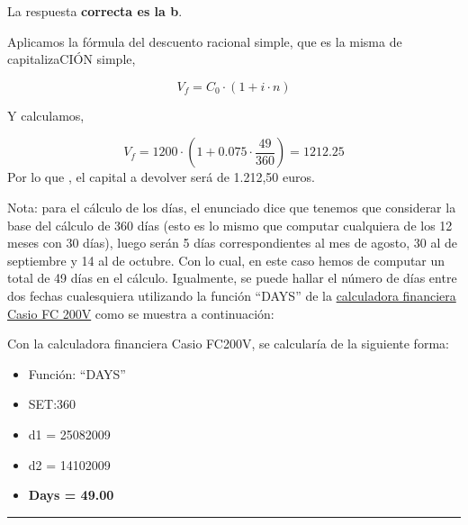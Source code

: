 \documentclass[
  letterpaper,
  DIV=11,
  numbers=noendperiod]{scrreprt}
\begin{document}
\begin{tcolorbox}[enhanced jigsaw, left=2mm, opacityback=0, colback=white, breakable, arc=.35mm, bottomrule=.15mm, rightrule=.15mm, toprule=.15mm, leftrule=.75mm, colframe=quarto-callout-tip-color-frame]
\begin{minipage}[t]{5.5mm}
\textcolor{quarto-callout-tip-color}{\faLightbulb}
\end{minipage}%
\begin{minipage}[t]{\textwidth - 5.5mm}

La respuesta \textbf{correcta es la b}.

Aplicamos la fórmula del descuento racional simple, que es la misma de
capitalizaCIÓN simple,

\[V_f=C_0\cdot(1+i\cdot n)\]

Y calculamos,

\[V_f=1200\cdot\left(1+0.075\cdot\frac{49}{360}\right)=1212.25\] Por lo
que , el capital a devolver será de 1.212,50 euros.

Nota: para el cálculo de los días, el enunciado dice que tenemos que
considerar la base del cálculo de 360 días (esto es lo mismo que
computar cualquiera de los 12 meses con 30 días), luego serán 5 días
correspondientes al mes de agosto, 30 al de septiembre y 14 al de
octubre. Con lo cual, en este caso hemos de computar un total de 49 días
en el cálculo. Igualmente, se puede hallar el número de días entre dos
fechas cualesquiera utilizando la función ``DAYS'' de la
\href{https://www.albertobernat.com/calculadora-cientifica-y-financiera/}{calculadora
financiera Casio FC 200V} como se muestra a continuación:

Con la calculadora financiera Casio FC200V, se calcularía de la
siguiente forma:

\begin{itemize}
\item
  Función: ``DAYS''
\item
  SET:360
\item
  d1 = 25082009
\item
  d2 = 14102009
\item
  \textbf{Days = 49.00}
\end{itemize}

\end{minipage}%
\end{tcolorbox}

\begin{center}\rule{0.5\linewidth}{0.5pt}\end{center}
\end{document}
